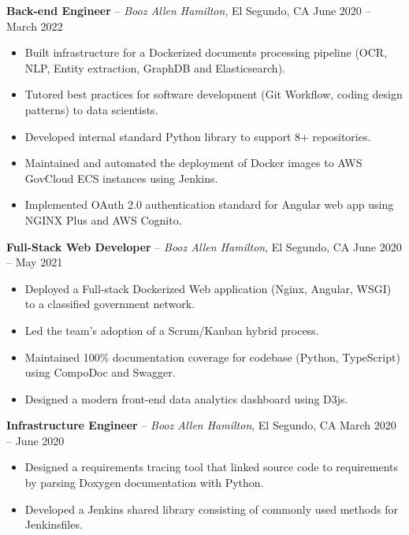 \documentclass[10pt,letterpaper]{article}
\begin{document}
\vspace{6pt}

\noindent
\textbf{Back-end Engineer} -- \textit{Booz Allen Hamilton}, El Segundo, CA \hfill June 2020 -- March 2022
\begin{itemize}
    \item Built infrastructure for a Dockerized documents processing pipeline (OCR, NLP, Entity extraction, GraphDB and Elasticsearch).
    \item Tutored best practices for software development (Git Workflow, coding design patterns) to data scientists.
    \item Developed internal standard Python library to support 8+ repositories.
    \item Maintained and automated the deployment of Docker images to AWS GovCloud ECS instances using Jenkins.
    \item Implemented OAuth 2.0 authentication standard for Angular web app using NGINX Plus and AWS Cognito.
\end{itemize}

\vspace{6pt}

\noindent
\textbf{Full-Stack Web Developer} -- \textit{Booz Allen Hamilton}, El Segundo, CA \hfill June 2020 -- May 2021
\begin{itemize}
    \item Deployed a Full-stack Dockerized Web application (Nginx, Angular, WSGI) to a classified government network.
    \item Led the team's adoption of a Scrum/Kanban hybrid process.
    \item Maintained 100\% documentation coverage for codebase (Python, TypeScript) using CompoDoc and Swagger.
    \item Designed a modern front-end data analytics dashboard using D3js.
\end{itemize}

\vspace{6pt}

\noindent
\textbf{Infrastructure Engineer} -- \textit{Booz Allen Hamilton}, El Segundo, CA \hfill March 2020 -- June 2020
\begin{itemize}
    \item Designed a requirements tracing tool that linked source code to requirements by parsing Doxygen documentation with Python.
    \item Developed a Jenkins shared library consisting of commonly used methods for Jenkinsfiles.
\end{itemize}
\end{document}

